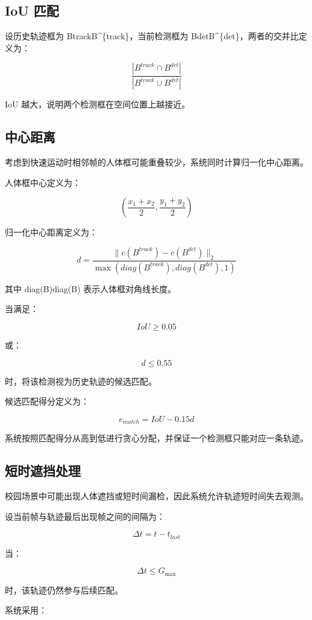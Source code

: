 \subsection{IoU 匹配}

设历史轨迹框为 BtrackB\textasciicircum{}\{track\}，当前检测框为 BdetB\textasciicircum{}\{det\}，两者的交并比定义为：

\[
\frac{
|B^{track}\cap B^{det}|
}{
|B^{track}\cup B^{det}|
}
\]

IoU 越大，说明两个检测框在空间位置上越接近。

\subsection{中心距离}

考虑到快速运动时相邻帧的人体框可能重叠较少，系统同时计算归一化中心距离。

人体框中心定义为：

\[
\left(
\frac{x_1+x_2}{2},
\frac{y_1+y_2}{2}
\right)
\]

归一化中心距离定义为：

\[
d=
\frac{
\|c(B^{track})-c(B^{det})\|_2
}{
\max(
diag(B^{track}),
diag(B^{det}),
1
)
}
\]

其中 diag(B)diag(B) 表示人体框对角线长度。

当满足：

\[
IoU\geq0.05
\]

或：

\[
d\leq0.55
\]

时，将该检测视为历史轨迹的候选匹配。

候选匹配得分定义为：

\[
e_{match}=IoU-0.15d
\]

系统按照匹配得分从高到低进行贪心分配，并保证一个检测框只能对应一条轨迹。

\subsection{短时遮挡处理}

校园场景中可能出现人体遮挡或短时间漏检，因此系统允许轨迹短时间失去观测。

设当前帧与轨迹最后出现帧之间的间隔为：

\[
\Delta t=t-t_{last}
\]

当：

\[
\Delta t\leq G_{\max}
\]

时，该轨迹仍然参与后续匹配。

系统采用：

